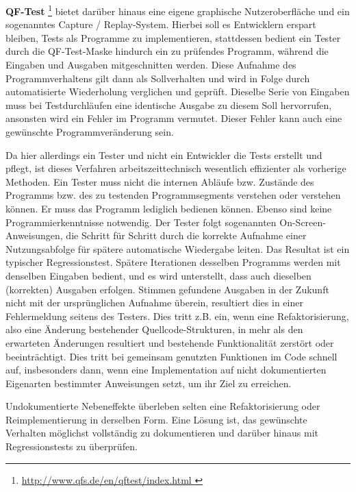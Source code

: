 \vspace{0.5cm}

\textbf{QF-Test} \footnote{\url{ http://www.qfs.de/en/qftest/index.html }} 
bietet darüber hinaus eine eigene graphische Nutzeroberfläche
und ein sogenanntes \glqq{}Capture / Replay\grqq{}-System. Hierbei soll es Entwicklern erspart bleiben,
Tests als Programme zu implementieren, stattdessen bedient ein Tester durch die QF-Test-Maske
hindurch ein zu prüfendes Programm, während die Eingaben und Ausgaben mitgeschnitten werden.
Diese Aufnahme des Programmverhaltens gilt dann als \glqq{}Sollverhalten\grqq{} und wird in Folge
durch automatisierte Wiederholung verglichen und geprüft. Dieselbe Serie von Eingaben muss
bei Testdurchläufen eine identische Ausgabe zu diesem Soll hervorrufen, ansonsten
wird ein Fehler im Programm vermutet. Dieser Fehler kann auch eine gewünschte Programmveränderung sein.

Da hier allerdings ein Tester und nicht ein Entwickler die Tests erstellt und pflegt, ist dieses
Verfahren arbeitszeittechnisch wesentlich effizienter als vorherige Methoden. Ein Tester muss
nicht die internen Abläufe bzw. Zustände des Programms bzw. des zu testenden Programmsegments 
verstehen oder verstehen können. Er muss das Programm lediglich
bedienen können. Ebenso sind keine Programmierkenntnisse notwendig. Der Tester folgt sogenannten
\glqq{}On-Screen\grqq{}-Anweisungen, die Schritt für Schritt durch die korrekte Aufnahme einer
Nutzungsabfolge für spätere automatische Wiedergabe leiten. Das Resultat ist ein typischer
Regressionstest. Spätere Iterationen desselben Programms werden mit denselben Eingaben
bedient, und es wird unterstellt, dass auch dieselben (korrekten) Ausgaben erfolgen.
Stimmen gefundene Ausgaben in der Zukunft nicht mit der ursprünglichen Aufnahme überein, resultiert
dies in einer Fehlermeldung seitens des Testers. Dies tritt z.B. ein, wenn eine Refaktorisierung,
also eine Änderung bestehender Quellcode-Strukturen, in mehr als den erwarteten Änderungen
resultiert und bestehende Funktionalität zerstört oder beeinträchtigt. Dies tritt bei
gemeinsam genutzten Funktionen im Code schnell auf, insbesonders dann, wenn eine Implementation 
auf nicht dokumentierten Eigenarten bestimmter Anweisungen setzt, um ihr Ziel zu erreichen.

Undokumentierte Nebeneffekte überleben selten eine Refaktorisierung oder Reimplementierung
in derselben Form. Eine Lösung ist, das gewünschte Verhalten möglichst vollständig zu dokumentieren
und darüber hinaus mit Regressionstests zu überprüfen.


